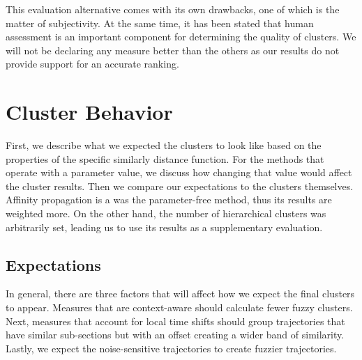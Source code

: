 This evaluation alternative comes with its own drawbacks, one of which is the matter of subjectivity. 
At the same time, it has been stated that human assessment is an important component for determining the quality of clusters\cite{79-SilhouetteAnalysis}. 
We will not be declaring any measure better than the others as our results do not provide support for an accurate ranking.








\section{Cluster Behavior}

First, we describe what we expected the clusters to look like based on the properties of the specific similarly distance function. 
For the methods that operate with a parameter value, we discuss how changing that value would affect the cluster results.
Then we compare our expectations to the clusters themselves.
Affinity propagation is a was the parameter-free method, thus its results are weighted more.
On the other hand, the number of hierarchical clusters was arbitrarily set, leading us to use its results as a supplementary evaluation. 


\subsection{Expectations}
In general, there are three factors that will affect how we expect the final clusters to appear. 
Measures that are context-aware should calculate fewer fuzzy clusters.  
Next, measures that account for local time shifts should group trajectories that have similar sub-sections but with an offset creating a wider band of similarity.
Lastly, we expect the noise-sensitive trajectories to create fuzzier trajectories.  


